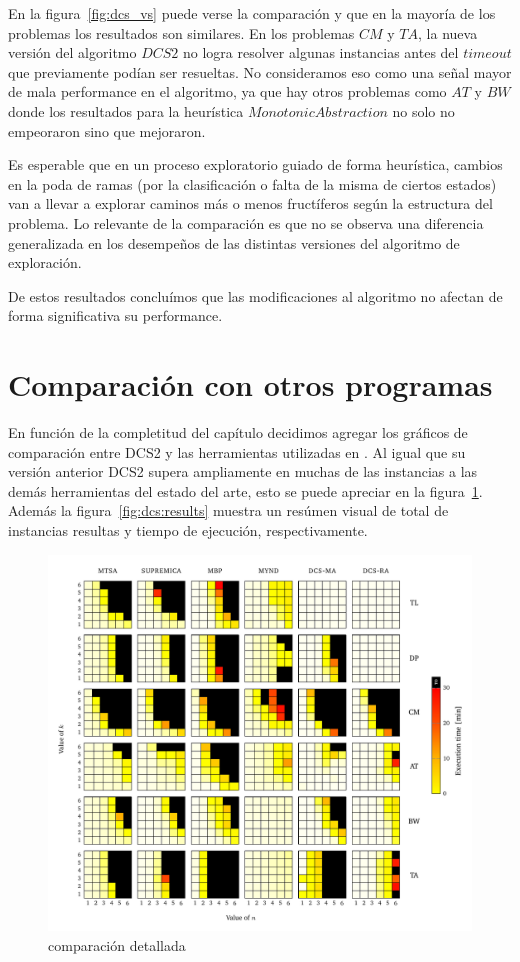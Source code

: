 En la figura~\ref{fig:dcs_vs} puede verse la comparación y que en la mayoría de los problemas los resultados son similares. En los problemas $CM$ y $TA$, la nueva versión del algoritmo $DCS2$ no logra resolver algunas instancias antes del $timeout$ que previamente podían ser resueltas. No consideramos eso como una señal mayor de mala performance en el algoritmo, ya que hay otros problemas como $AT$ y $BW$ donde los resultados para la heurística $Monotonic Abstraction$ no solo no empeoraron sino que mejoraron.

Es esperable que en un proceso exploratorio guiado de forma heurística, cambios en la poda de ramas (por la clasificación o falta de la misma de ciertos estados) van a llevar a explorar caminos más o menos fructíferos según la estructura del problema. Lo relevante de la comparación es que no se observa una diferencia generalizada en los desempeños de las distintas versiones del algoritmo de exploración.

De estos resultados concluímos que las modificaciones al algoritmo no afectan de forma significativa su performance.

\section{Comparación con otros programas}

En función de la completitud del capítulo decidimos agregar los gráficos de comparación entre DCS2 y las herramientas utilizadas en \cite{tesisDani}. Al igual que su versión anterior DCS2 supera ampliamente en muchas de las instancias a las demás herramientas del estado del arte, esto se puede apreciar en la figura~\ref{fig:vs_otros}. Además la figura~\ref{fig:dcs:results} muestra un resúmen visual de total de instancias resultas y tiempo de ejecución, respectivamente.


\begin{figure}[htb]
	\centering
	\includegraphics[width=\linewidth]{figures/nuestrosResults/detailed.pdf}  
	\caption{comparación detallada}
	\label{fig:vs_otros}
\end{figure}

